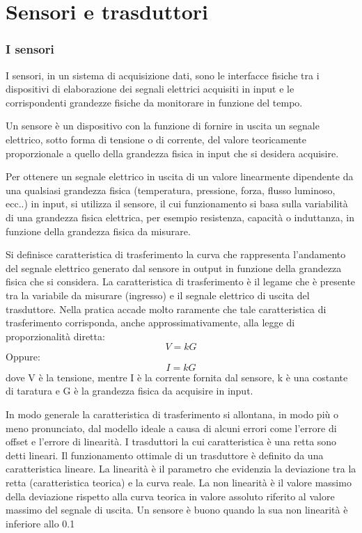 \documentclass[a4paper,12pt]{article}
\begin{document}
\part{Sensori e trasduttori}
\section{I sensori}
I sensori, in un sistema di acquisizione dati, sono le interfacce fisiche tra i dispositivi di elaborazione dei segnali elettrici acquisiti in input e le corrispondenti grandezze fisiche da monitorare in funzione del tempo. 

Un sensore è un dispositivo con la funzione di fornire in uscita un segnale elettrico, sotto forma di tensione o di corrente, del valore teoricamente proporzionale a quello della grandezza fisica in input che si desidera acquisire. 

Per ottenere un segnale elettrico in uscita di un valore linearmente dipendente da una qualsiasi grandezza fisica (temperatura, pressione, forza, flusso luminoso, ecc..) in input, si utilizza il sensore, il cui funzionamento si basa sulla variabilità di una grandezza fisica elettrica, per esempio resistenza, capacità o induttanza, in funzione della grandezza fisica da misurare.

Si definisce caratteristica di trasferimento la curva che rappresenta l'andamento del segnale elettrico generato dal sensore in output in funzione della grandezza fisica che si considera.
La caratteristica di trasferimento è il legame che è presente tra la variabile da misurare (ingresso) e il segnale elettrico di uscita del trasduttore. 
Nella pratica accade molto raramente che tale caratteristica di trasferimento corrisponda, anche approssimativamente, alla legge di proporzionalità diretta: 
\begin{equation}
V = k G
\end{equation}
Oppure:
\begin{equation}
I = k G
\end{equation}
dove V è la tensione, mentre I è la corrente fornita dal sensore, k è una costante di taratura e G è la grandezza fisica da acquisire in input.

In modo generale la caratteristica di trasferimento si allontana, in modo più o meno pronunciato, dal modello ideale a causa di alcuni errori come l'errore di offset e l'errore di linearità. I trasduttori la cui caratteristica è una retta sono detti lineari. Il funzionamento ottimale di un trasduttore è definito da una caratteristica lineare. La linearità è il parametro che evidenzia la deviazione tra la retta (caratteristica teorica) e la curva reale. La non linearità è il valore massimo della deviazione rispetto alla curva teorica in valore assoluto riferito al valore massimo del segnale di uscita. Un sensore è buono quando la sua non linearità è inferiore allo 0.1%
\end{document}
